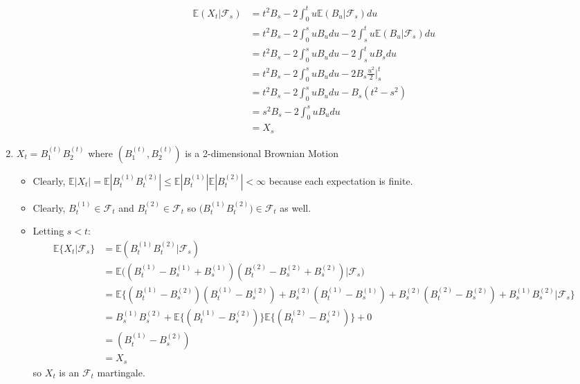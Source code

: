 \documentclass[11pt]{article}
\newcommand{\fcal}{\mathcal{F}}
\newcommand\abs[1]{\left|#1\right|}
\newcommand{\E}{\mathbb{E}}
\begin{document}
\begin{enumerate}
\begin{itemize}
\begin{align*}
\E( X_t | \fcal_s) &= t^2 B_s - 2 \int_0^t u \E(B_u | \fcal_s) du\\
&= t^2B_s -2 \int_0^s u B_u du -2 \int_s^t u \E(B_u|\fcal_s) du\\
&= t^2B_s -2 \int_0^s u B_u du-2 \int_s^t u B_s du \\
&= t^2B_s -2 \int_0^s u B_u du - 2 B_s \frac{u^2}{2}\Big|_s^t\\
&= t^2B_s -2 \int_0^s u B_u du - B_s (t^2-s^2)\\
&= s^2 B_s -2 \int_0^s u B_u du\\& = X_s
\end{align*}
 \end{itemize}
 \newpage
 \item $X _ { t } = B _{ 1 }^{( t )} B _ { 2 }^{( t )}$ where $\left( B _ { 1 }^{( t )} , B _ { 2 }^{( t )} \right)$ is a 2-dimensional Brownian Motion
 \begin{itemize}
 \item Clearly, $\E \abs{X_t}= \E \abs{B_t^{(1)}B_t^{(2)}}\leq \E \abs{B_t^{(1)}} \E \abs{B_t^{(2)}} <\infty$ because each expectation is finite.
 \item Clearly, $B_t^{(1)} \in \fcal_t$ and $B_t^{(2)} \in \fcal_t$ so $\Big(B_t^{(1)}B_t^{(2)}\Big) \in \fcal_t$ as well.
 \item Letting $s<t$:
 \begin{align*}
 \E\{X_t|\fcal_s\} &= \E (B_t^{(1)}B_t^{(2)}|\fcal_s)\\
 &= \E \Big( (B_t^{(1)}- B_s^{(1)} + B_s^{(1)}  ) (B_t^{(2)}- B_s^{(2)} + B_s^{(2)}  ) |\fcal_s \Big)\\
 &=\E \Big\{  (B_t^{(1)}-B_s^{(2)})(B_t^{(1)}-B_s^{(2)}) + B_s^{(2)}(B_t^{(1)}-B_s^{(1)})+B_s^{(2)}(B_t^{(2)}-B_s^{(2)}) +B_s^{(1)}B_s^{(2)} \Big| \fcal_s \Big\}\\
 &=B_s^{(1)}B_s^{(2)}+ \E\{(B_t^{(1)}-B_s^{(2)})\} \E \{(B_t^{(2)}-B_s^{(2)})\}+0 \\
 &=(B_t^{(1)}-B_s^{(2)})\\
 &= X_s
 \end{align*}
 so $X_t$ is an $\fcal_t$ martingale.
 \end{itemize}
 \end{enumerate}
\end{document}
